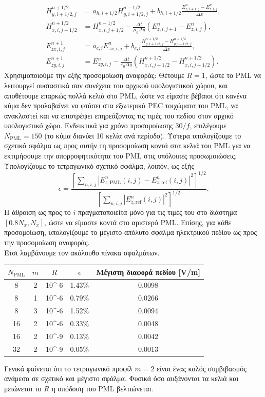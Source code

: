 \documentclass[12pt]{article}
\begin{document}
\begin{align*}
H_{y,i+1/2,j}^{n+1/2}
&=
a_{h,i+1/2}H_{y,i+1/2,j}^{n-1/2}
+
b_{h,i+1/2}
\frac{E_{z,i+1,j}^{n}-E_{z,i,j}^{n}}{\Delta x}, \\
H_{x,i,j+1/2}^{n+1/2}
&=
H_{x,i,j+1/2}^{n-1/2}
-\frac{\Delta t}{\mu_0\Delta y}
\left(E_{z,i,j+1}^{n}-E_{z,i,j}^{n}\right),\\
E_{zx,i,j}^{n+1}
&=
a_{e,i}E_{zx,i,j}^{n}
+
b_{e,i}
\frac{H_{y,i+1/2,j}^{n+1/2}-H_{y,i-1/2,j}^{n+1/2}}
{\Delta x},\\
E_{zy,i,j}^{n+1}
&=
E_{zy,i,j}^{n}
-\frac{\Delta t}{\varepsilon_0\Delta y}
\left(H_{x,i,j+1/2}^{n+1/2}-H_{x,i,j-1/2}^{n+1/2}\right).
\end{align*}
Χρησιμοποιούμε την εξής προσομοίωση αναφοράς: Θέτουμε $R=1$, ώστε το PML να λειτουργεί ουσιαστικά σαν συνέχεια του αρχικού υπολογιστικού χώρου, και αποθέτουμε επαρκώς πολλά κελιά στο PML, ώστε να είμαστε βέβαιοι ότι κανένα κύμα δεν προλαβαίνει να φτάσει στα εξωτερικά PEC τοιχώματα του PML, να ανακλαστεί και να επιστρέψει επηρεάζοντας τις τιμές του πεδίου στον αρχικό υπολογιστικό χώρο. Ενδεικτικά για χρόνο προσομοίωσης $30/f$, επιλέγουμε $N_\text{PML} = 150$ (το κύμα διανύει 10 κελία ανά περίοδο). Ύστερα υπολογίζουμε το σχετικό σφάλμα ως προς αυτήν τη προσομοίωση κοντά στα κελιά του PML για να εκτιμήσουμε την απορροφητικότητα του PML στις υπόλοιπες προσωμοιώσεις. Υπολογίζουμε το τετραγωνικό σχετικό σφάλμα, λοιπόν, ως εξής
\[
\epsilon =
\frac{
\left[\sum_{n,i,j}
\left|E_{z,\mathrm{PML}}^{n}(i,j)
-E_{z,\mathrm{ref}}^{n}(i,j)\right|^2\right]^{1/2}
}{
\left[\sum_{n,i,j}
\left|E_{z,\mathrm{ref}}^{n}(i,j)\right|^2\right]^{1/2}
}.
\]
Η άθροιση ως προς το $i$ πραγματοποιείτα μόνο για τις τιμές του στο διάστημα $[0.8 N_x, N_x]$, ώστε να είμαστε κοντά στο αριστερό PML. Επίσης, για κάθε προσομοίωση, υπολογίζουμε το μέγιστο απόλυτο σφάλμα ηλεκτρικού πεδίου ως προς την προσομοίωση αναφοράς. \\
Έτσι λαμβάνουμε τον ακόλουθο πίνακα σφαλμάτων.
\begin{table}[htbp]
    \centering
    \begin{tabular}{c c c c c}
        \hline
        $N_\text{PML}$ & $m$ & $R$ & $\epsilon$ &
        Μέγιστη διαφορά πεδίου [V/m] \\
        \hline
         8 &  2 & 10^{-6} & 1.43\% & 0.0098 \\
         8 &  1 & 10^{-6} & 0.79\% & 0.0266 \\
         8 &  3 & 10^{-6} & 1.52\% & 0.0094 \\
         16 & 2 & 10^{-6} & 0.33\% & 0.0048 \\
         16 & 2 & 10^{-9} & 0.13\% & 0.0042 \\
         32 & 2 & 10^{-9} & 0.05\% & 0.0013 \\
        \hline
    \end{tabular}
\end{table}
Γενικά φαίνεται ότι το τετραγωνικό προφίλ $m=2$ είναι ένας καλός συμβιβασμός ανάμεσα σε σχετικό και μέγιστο σφάλμα. Φυσικά όσο αυξάνονται τα κελιά και μειώνεται το $R$ η απόδοση του PML βελτιώνεται. \\
\end{document}
